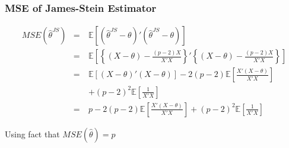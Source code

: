 \begin{frame}
  \frametitle{MSE of James-Stein Estimator}
  \small
\begin{eqnarray*}
  MSE\left( \hat{\theta}^{JS} \right) &=& \mathbb{E}\left[ \left( \hat{\theta}^{JS} - \theta \right)'\left( \hat{\theta}^{JS} - \theta \right) \right]\\
  &=& \mathbb{E}\left[ \left\{ \left( X - \theta \right) - \frac{(p-2)X}{X'X} \right\}' \left\{ \left( X - \theta \right) - \frac{(p-2)X}{X'X} \right\} \right]  \\
  &=&\mathbb{E}\left[ \left( X - \theta \right)'\left( X - \theta \right) \right] - 2 (p-2)\mathbb{E}\left[ \frac{X'(X-\theta)}{X'X} \right]\\
  &\quad& +\left( p-2 \right)^{2} \mathbb{E}\left[ \frac{1}{X'X} \right] \\
  &=& p - 2 (p-2)\mathbb{E}\left[ \frac{X'(X-\theta)}{X'X} \right] + \left( p-2 \right)^{2} \mathbb{E}\left[ \frac{1}{X'X} \right]
\end{eqnarray*}

Using fact that $MSE(\widehat{\theta})=p$ 
\end{frame}
